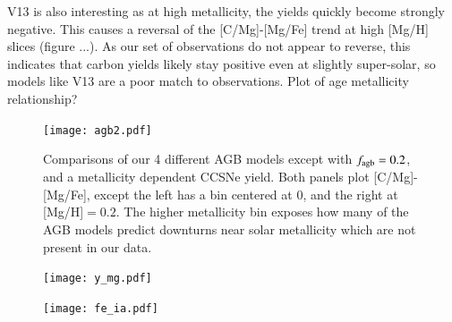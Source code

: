 \documentclass[12pt,oneside]{report}
\begin{document}
V13 is also interesting as at high metallicity, the yields quickly become strongly negative. This causes a reversal of the [C/Mg]-[Mg/Fe] trend at high [Mg/H] slices (figure ...). As our set of observations do not appear to reverse, this indicates that carbon yields likely stay positive even at slightly super-solar, so models like V13 are a poor match to observations. 
Plot of age metallicity relationship?


\begin{figure}[htp]
    \centering
    \texttt{[image: agb2.pdf]}

    \caption[Alternate AGB models]{Comparisons of our 4 different AGB models except with $f_{\rm agb} = 0.2$, and a metallicity dependent CCSNe yield. Both panels plot [C/Mg]-[Mg/Fe], except the left has a bin centered at 0, and the right at [Mg/H]$=0.2$. The higher metallicity bin exposes how many of the AGB models predict downturns near solar metallicity which are not present in our data.}
\end{figure}


\begin{figure}
    \texttt{[image: y\_mg.pdf]}
\end{figure}

\begin{figure}
    \texttt{[image: fe\_ia.pdf]}
\end{figure}




\label{lastpage}
\end{document}

